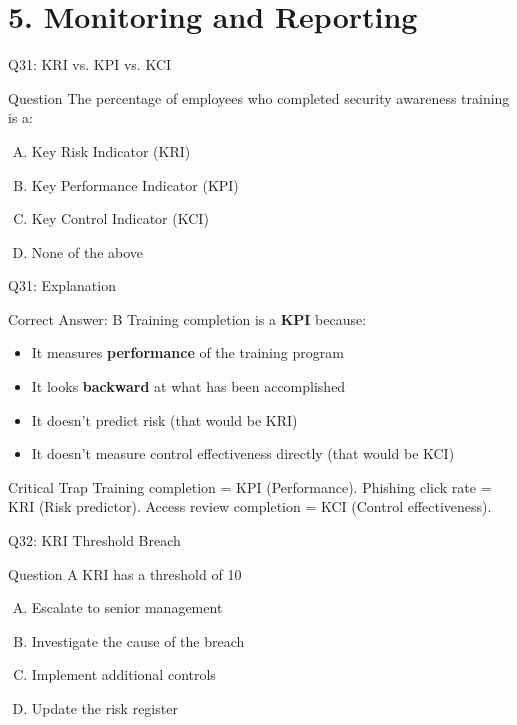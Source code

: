 \documentclass{beamer}
\begin{document}
	
	\section{5. Monitoring and Reporting}
	
	\begin{frame}{Q31: KRI vs. KPI vs. KCI}
		\begin{block}{Question}
			The percentage of employees who completed security awareness training is a:
		\end{block}
		\begin{enumerate}[(A)]
			\item Key Risk Indicator (KRI)
			\item Key Performance Indicator (KPI)
			\item Key Control Indicator (KCI)
			\item None of the above
		\end{enumerate}
	\end{frame}
	
	\begin{frame}{Q31: Explanation}
		\begin{block}{Correct Answer: B}
			Training completion is a \textbf{KPI} because:
			\begin{itemize}
				\item It measures \textbf{performance} of the training program
				\item It looks \textbf{backward} at what has been accomplished
				\item It doesn't predict risk (that would be KRI)
				\item It doesn't measure control effectiveness directly (that would be KCI)
			\end{itemize}
		\end{block}
		\begin{alertblock}{Critical Trap}
			Training completion = KPI (Performance).
			Phishing click rate = KRI (Risk predictor).
			Access review completion = KCI (Control effectiveness).
		\end{alertblock}
	\end{frame}
	
	\begin{frame}{Q32: KRI Threshold Breach}
		\begin{block}{Question}
			A KRI has a threshold of 10%
		\end{block}
		\begin{enumerate}[(A)]
			\item Escalate to senior management
			\item Investigate the cause of the breach
			\item Implement additional controls
			\item Update the risk register
		\end{enumerate}
	\end{frame}
	
\end{document}
